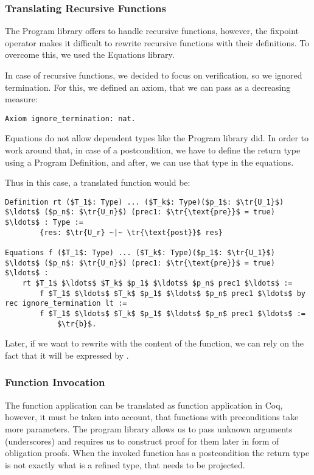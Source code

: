 \subsubsection{Translating Recursive Functions}

The Program library offers  to handle recursive functions, however, the fixpoint operator makes it difficult to rewrite recursive functions with their definitions. To overcome this, we used the Equations library. 

In case of recursive functions, we decided to focus on verification, so we ignored termination. For this, we defined an axiom, that we can pass as a decreasing measure:

\begin{lstlisting}[style=myCoqStyle]
	Axiom ignore_termination: nat.
\end{lstlisting}

Equations do not allow dependent types like the Program library did. In order to work around that, in case of a postcondition, we have to define the return type using a Program Definition, and after, we can use that type in the equations.

Thus in this case, a translated function would be:

\begin{lstlisting}[style=myCoqstyle]  
Definition rt ($T_1$: Type) ... ($T_k$: Type)($p_1$: $\tr{U_1}$) $\ldots$ ($p_n$: $\tr{U_n}$) (prec1: $\tr{\text{pre}}$ = true) $\ldots$ : Type :=
		{res: $\tr{U_r} ~|~ \tr{\text{post}}$ res}

Equations f ($T_1$: Type) ... ($T_k$: Type)($p_1$: $\tr{U_1}$) $\ldots$ ($p_n$: $\tr{U_n}$) (prec1: $\tr{\text{pre}}$ = true) $\ldots$ : 
	rt $T_1$ $\ldots$ $T_k$ $p_1$ $\ldots$ $p_n$ prec1 $\ldots$ :=
		f $T_1$ $\ldots$ $T_k$ $p_1$ $\ldots$ $p_n$ prec1 $\ldots$ by rec ignore_termination lt :=
		f $T_1$ $\ldots$ $T_k$ $p_1$ $\ldots$ $p_n$ prec1 $\ldots$ :=
			$\tr{b}$.
\end{lstlisting}

Later, if we want to rewrite with the content of the function, we can rely on the fact that it will be expressed by .

\subsubsection{Function Invocation}

The function application can be translated as function application in Coq, however, it must be taken into account, that functions with preconditions take more parameters. The program library allows us to pass unknown arguments (underscores) and requires us to construct proof for them later in form of obligation proofs. When the invoked function has a postcondition the return type is not exactly what is a refined type, that needs to be projected.

